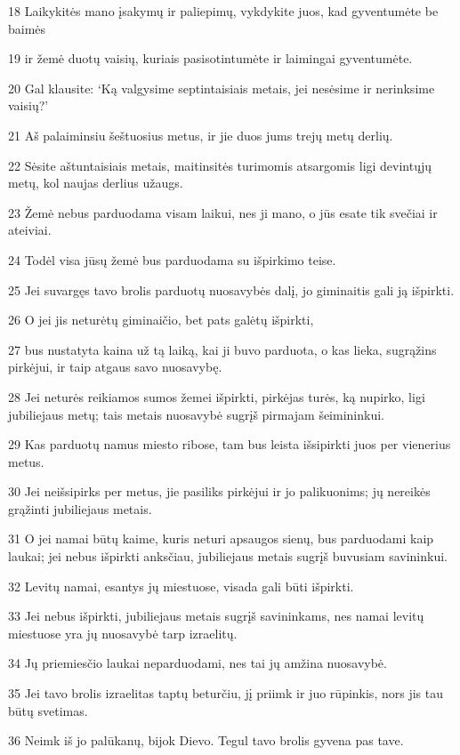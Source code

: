 \par 18 Laikykitės mano įsakymų ir paliepimų, vykdykite juos, kad gyventumėte be baimės 
\par 19 ir žemė duotų vaisių, kuriais pasisotintumėte ir laimingai gyventumėte. 
\par 20 Gal klausite: ‘Ką valgysime septintaisiais metais, jei nesėsime ir nerinksime vaisių?’ 
\par 21 Aš palaiminsiu šeštuosius metus, ir jie duos jums trejų metų derlių. 
\par 22 Sėsite aštuntaisiais metais, maitinsitės turimomis atsargomis ligi devintųjų metų, kol naujas derlius užaugs. 
\par 23 Žemė nebus parduodama visam laikui, nes ji mano, o jūs esate tik svečiai ir ateiviai. 
\par 24 Todėl visa jūsų žemė bus parduodama su išpirkimo teise. 
\par 25 Jei suvargęs tavo brolis parduotų nuosavybės dalį, jo giminaitis gali ją išpirkti. 
\par 26 O jei jis neturėtų giminaičio, bet pats galėtų išpirkti, 
\par 27 bus nustatyta kaina už tą laiką, kai ji buvo parduota, o kas lieka, sugrąžins pirkėjui, ir taip atgaus savo nuosavybę. 
\par 28 Jei neturės reikiamos sumos žemei išpirkti, pirkėjas turės, ką nupirko, ligi jubiliejaus metų; tais metais nuosavybė sugrįš pirmajam šeimininkui. 
\par 29 Kas parduotų namus miesto ribose, tam bus leista išsipirkti juos per vienerius metus. 
\par 30 Jei neišsipirks per metus, jie pasiliks pirkėjui ir jo palikuonims; jų nereikės grąžinti jubiliejaus metais. 
\par 31 O jei namai būtų kaime, kuris neturi apsaugos sienų, bus parduodami kaip laukai; jei nebus išpirkti anksčiau, jubiliejaus metais sugrįš buvusiam savininkui. 
\par 32 Levitų namai, esantys jų miestuose, visada gali būti išpirkti. 
\par 33 Jei nebus išpirkti, jubiliejaus metais sugrįš savininkams, nes namai levitų miestuose yra jų nuosavybė tarp izraelitų. 
\par 34 Jų priemiesčio laukai neparduodami, nes tai jų amžina nuosavybė. 
\par 35 Jei tavo brolis izraelitas taptų beturčiu, jį priimk ir juo rūpinkis, nors jis tau būtų svetimas. 
\par 36 Neimk iš jo palūkanų, bijok Dievo. Tegul tavo brolis gyvena pas tave. 
